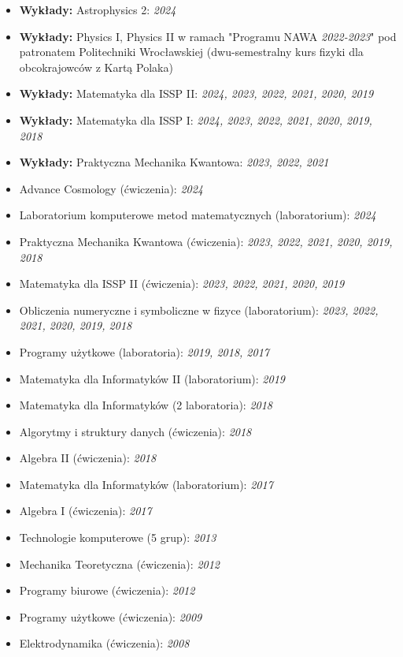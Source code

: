 \documentclass[12pt,a4paper]{article}
\begin{document}
\begin{itemize}
	\item \textbf{Wykłady:} Astrophysics 2: \textsl{2024}
	\item \textbf{Wykłady:}  Physics I, Physics II w ramach "Programu NAWA \textsl{2022-2023}" pod patronatem Politechniki Wrocławskiej (dwu-semestralny kurs fizyki dla obcokrajowców z Kartą Polaka)
	\item \textbf{Wykłady:} Matematyka dla ISSP II: \textsl{2024, 2023, 2022, 2021, 2020, 2019}
	\item \textbf{Wykłady:} Matematyka dla ISSP I: \textsl{2024, 2023, 2022, 2021, 2020, 2019, 2018}
	\item \textbf{Wykłady:} Praktyczna Mechanika Kwantowa: \textsl{2023, 2022, 2021}
	\item Advance Cosmology (ćwiczenia): \textsl{2024}
	\item Laboratorium komputerowe metod matematycznych (laboratorium): \textsl{2024}
	\item Praktyczna Mechanika Kwantowa (ćwiczenia): \textsl{2023, 2022, 2021, 2020, 2019, 2018}
	\item Matematyka dla ISSP II (ćwiczenia): \textsl{2023, 2022, 2021, 2020, 2019}
	\item Obliczenia numeryczne i symboliczne w fizyce (laboratorium): \textsl{2023, 2022, 2021, 2020, 2019, 2018}
	\item Programy użytkowe (laboratoria): \textsl{2019, 2018, 2017}
	\item Matematyka dla Informatyków II (laboratorium): \textsl{2019}
	\item Matematyka dla Informatyków (2 laboratoria): \textsl{2018}
	\item Algorytmy i struktury danych (ćwiczenia): \textsl{2018}
	\item Algebra II (ćwiczenia): \textsl{2018}
	\item Matematyka dla Informatyków (laboratorium): \textsl{2017}
	\item Algebra I (ćwiczenia): \textsl{2017}
	\item Technologie komputerowe (5 grup): \textsl{2013}
	\item Mechanika Teoretyczna (ćwiczenia): \textsl{2012}
	\item Programy biurowe (ćwiczenia): \textsl{2012}
	\item Programy użytkowe (ćwiczenia): \textsl{2009}
	\item Elektrodynamika (ćwiczenia): \textsl{2008}
\end{itemize}
\end{document}
